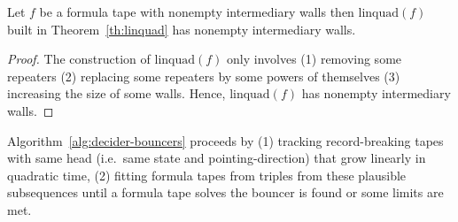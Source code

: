 \begin{lemma}\label{lem:linquad-intermediary-walls}
    Let $f$ be a formula tape with nonempty intermediary walls then $\text{linquad}(f)$ built in Theorem~\ref{th:linquad} has nonempty intermediary walls.
\end{lemma}
\begin{proof}
    The construction of $\text{linquad}(f)$ only involves (1) removing some repeaters (2) replacing some repeaters by some powers of themselves (3) increasing the size of some walls. Hence, $\text{linquad}(f)$ has nonempty intermediary walls.
\end{proof}

Algorithm~\ref{alg:decider-bouncers} proceeds by (1) tracking record-breaking tapes with same head (i.e.\ same state and pointing-direction) that grow linearly in quadratic time, (2) fitting formula tapes from triples from these plausible subsequences until a formula tape solves the bouncer is found or some limits are met.







